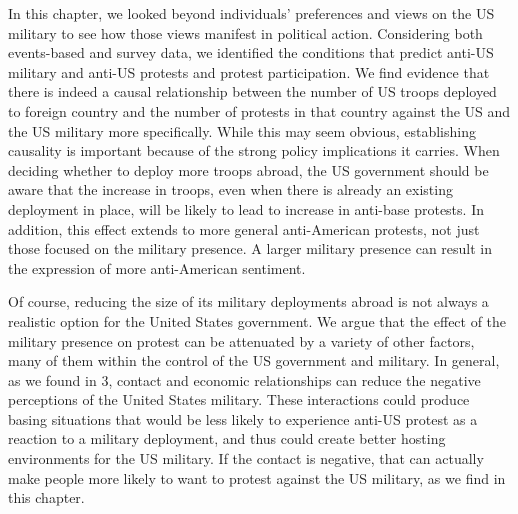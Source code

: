 



In this chapter, we looked beyond individuals' preferences and views on the US military to see how those views manifest in political action. Considering both events-based and survey data, we identified the conditions that predict anti-US military and anti-US protests and protest participation. We find evidence that there is indeed a causal relationship between the number of US troops deployed to foreign country and the number of protests in that country against the US and the US military more specifically. While this may seem obvious, establishing causality is important because of the strong policy implications it carries. When deciding whether to deploy more troops abroad, the US government should be aware that the increase in troops, even when there is already an existing deployment in place, will be likely to lead to increase in anti-base protests. In addition, this effect extends to more general anti-American protests, not just those focused on the military presence. A larger military presence can result in the expression of more anti-American sentiment.

Of course, reducing the size of its military deployments abroad is not always a realistic option for the United States government. We argue that the effect of the military presence on protest can be attenuated by a variety of other factors, many of them within the control of the US government and military. In general, as we found in 3, contact and economic relationships can reduce the negative perceptions of the United States military. These interactions could produce basing situations that would be less likely to experience anti-US protest as a reaction to a military deployment, and thus could create better hosting environments for the US military. If the contact is negative, that can actually make people more likely to want to protest against the US military, as we find in this chapter. 


